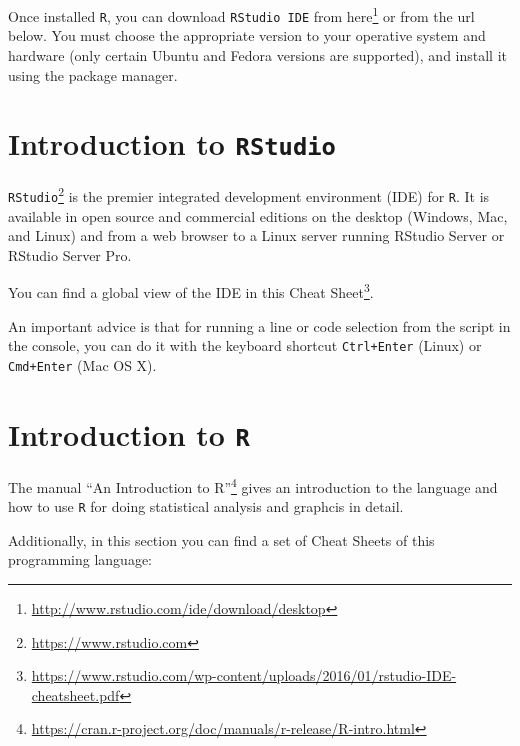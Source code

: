 \documentclass[]{book}
\let\rmarkdownfootnote\footnote%
\def\footnote{\protect\rmarkdownfootnote}
\renewcommand{\href}[2]{#2\footnote{\url{#1}}}
\theoremstyle{definition}
\theoremstyle{definition}
\theoremstyle{definition}
\theoremstyle{remark}
\begin{document}
Once installed \texttt{R}, you can download \texttt{RStudio\ IDE} from
\href{http://www.rstudio.com/ide/download/desktop}{here} or from the url
below. You must choose the appropriate version to your operative system
and hardware (only certain Ubuntu and Fedora versions are supported),
and install it using the package manager.

\chapter{\texorpdfstring{Introduction to
\texttt{RStudio}}{Introduction to RStudio}}\label{appendix-rstudio}

\href{https://www.rstudio.com}{\texttt{RStudio}} is the premier
integrated development environment (IDE) for \texttt{R}. It is available
in open source and commercial editions on the desktop (Windows, Mac, and
Linux) and from a web browser to a Linux server running RStudio Server
or RStudio Server Pro.

You can find a global view of the IDE in this
\href{https://www.rstudio.com/wp-content/uploads/2016/01/rstudio-IDE-cheatsheet.pdf}{Cheat
Sheet}.

An important advice is that for running a line or code selection from
the script in the console, you can do it with the keyboard shortcut
\texttt{\textquotesingle{}Ctrl+Enter\textquotesingle{}} (Linux) or
\texttt{\textquotesingle{}Cmd+Enter\textquotesingle{}} (Mac OS X).

\chapter{\texorpdfstring{Introduction to
\texttt{R}}{Introduction to R}}\label{appendix-r}

The manual
\href{https://cran.r-project.org/doc/manuals/r-release/R-intro.html}{``An
Introduction to R''} gives an introduction to the language and how to
use \texttt{R} for doing statistical analysis and graphcis in detail.

Additionally, in this section you can find a set of Cheat Sheets of this
programming language:
\end{document}
